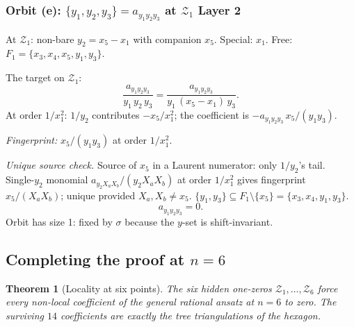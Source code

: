 \documentclass[11pt]{article}
\newcommand{\Z}{\mathcal{Z}}
\newtheorem{theorem}{Theorem}
\theoremstyle{definition}
\begin{document}
\subsubsection*{Orbit (e): $\{y_1, y_2, y_3\} = a_{y_1 y_2 y_3}$ at $\Z_1$ Layer 2}

At $\Z_1$: non-bare $y_2 = x_5 - x_1$ with companion $x_5$. Special: $x_1$.
Free: $F_1 = \{x_3, x_4, x_5, y_1, y_3\}$.

The target on $\Z_1$:
\[
\frac{a_{y_1 y_2 y_3}}{y_1\,y_2\,y_3} = \frac{a_{y_1 y_2 y_3}}{y_1\,(x_5-x_1)\,y_3}.
\]
At order $1/x_1^2$: $1/y_2$ contributes $-x_5/x_1^2$; the coefficient is
$-a_{y_1 y_2 y_3}\,x_5/(y_1 y_3)$.

\emph{Fingerprint:} $x_5/(y_1 y_3)$ at order $1/x_1^2$.

\emph{Unique source check.} Source of $x_5$ in a Laurent numerator: only
$1/y_2$'s tail. Single-$y_2$ monomial $a_{y_2 X_a X_b}/(y_2 X_a X_b)$ at
order $1/x_1^2$ gives fingerprint $x_5/(X_a X_b)$; unique provided $X_a,X_b
\ne x_5$. $\{y_1, y_3\}\subseteq F_1\setminus\{x_5\}=\{x_3,x_4,y_1,y_3\}$.
\[
\boxed{a_{y_1 y_2 y_3} = 0.}
\]
Orbit has size 1: fixed by $\sigma$ because the $y$-set is shift-invariant.

\subsection{Completing the proof at \texorpdfstring{$n=6$}{n=6}}

\begin{theorem}[Locality at six points]
\label{thm:n6}
The six hidden one-zeros $\Z_1,\ldots,\Z_6$ force every non-local
coefficient of the general rational ansatz at $n=6$ to zero. The surviving
$14$ coefficients are exactly the tree triangulations of the hexagon.
\end{theorem}
\end{document}
